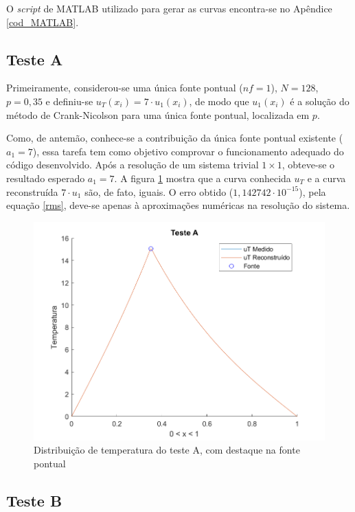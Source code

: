 \documentclass[12pt]{article}
\begin{document}
\begin{spacing}{1.5}
O \textit{script} de MATLAB utilizado para gerar as curvas encontra-se no Apêndice \ref{cod_MATLAB}.

\subsection{Teste A}

Primeiramente, considerou-se uma única fonte pontual ($n f =1$), $N=128$, $p=0,35$ e definiu-se $u_T(x_i) = 7\cdot u_1(x_i)$, de modo que $u_1(x_i)$ é a solução do método de Crank-Nicolson para uma única fonte pontual, localizada em $p$.

Como, de antemão, conhece-se a contribuição da única fonte pontual existente ($a_1=7$), essa tarefa tem como objetivo comprovar o funcionamento adequado do código desenvolvido. Após a resolução de um sistema trivial $1\times 1$, obteve-se o resultado esperado $a_1=7$. A figura \ref{fig:testeA} mostra que a curva conhecida $u_T$ e a curva reconstruída $7\cdot u_1$ são, de fato, iguais. O erro obtido ($1,142742\cdot10^{-15}$), pela equação \eqref{rms}, deve-se apenas à aproximações numéricas na resolução do sistema.

\begin{figure}[H]
    \centering
    \includegraphics[width=0.75\linewidth]{Imagens/FigA128.png}
    \caption{Distribuição de temperatura do teste A, com destaque na fonte pontual}
    \label{fig:testeA}
\end{figure}

\subsection{Teste B}


\end{spacing}
\end{document}
